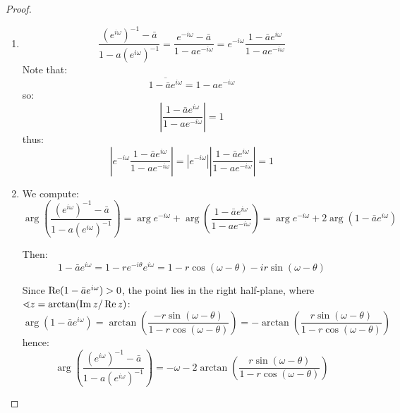 \begin{proof} \hfill
    \begin{enumerate}
        \item
              \[\frac{{(e^{i\omega})}^{-1} - \bar{a}}{1 - a{(e^{i\omega})}^{-1}}
                  = \frac{e^{-i\omega} - \bar{a}}{1 - a e^{-i\omega}}
                  = e^{-i\omega}\frac{1 - \bar{a} e^{i\omega}}{1 - a e^{-i\omega}}\]
              Note that:
              \[\overline{1 - \bar{a} e^{i\omega}} = 1 - a e^{-i\omega}\]
              so:
              \[\left|\frac{1 - \bar{a} e^{i\omega}}{1 - a e^{-i\omega}}\right| = 1\]
              thus:
              \[\left|e^{-i\omega}\frac{1 - \bar{a} e^{i\omega}}{1 - a e^{-i\omega}}\right|
                  =|e^{-i\omega}| \left|\frac{1 - \bar{a} e^{i\omega}}{1 - a e^{-i\omega}}\right|
                  = 1\]
        \item We compute:
              \[\arg \left(\frac{{(e^{i\omega})}^{-1} - \bar{a}}{1 - a{(e^{i\omega})}^{-1}} \right)
                  = \arg e^{-i\omega} + \arg \left(\frac{1 - \bar{a} e^{i\omega}}{1 - a e^{-i\omega}} \right)
                  = \arg e^{-i\omega} + 2 \arg{(1 - \bar{a} e^{i\omega})}\]

              Then:
              \[1 - \bar{a} e^{i\omega}
                  = 1 - r e^{-i \theta} e^{i\omega}
                  = 1 - r \cos (\omega - \theta) - i r \sin(\omega - \theta)\]

              Since $\operatorname{Re}(1-\bar a e^{i\omega}) > 0$, the point lies in the right half-plane, where $\sphericalangle z = \arctan(\operatorname{Im} z / \operatorname{Re} z)$:
              \[\arg{(1 - \bar{a} e^{i\omega})}
                  = \arctan \left(\frac{-r \sin(\omega - \theta)}{1 - r \cos (\omega - \theta)}\right)
                  = -\arctan \left(\frac{r \sin(\omega - \theta)}{1 - r \cos (\omega - \theta)}\right)\]
              hence:
              \[\arg \left(\frac{{(e^{i\omega})}^{-1} - \bar{a}}{1 - a{(e^{i\omega})}^{-1}} \right)
                  = -\omega - 2\arctan \left(\frac{r \sin(\omega - \theta)}{1 - r \cos (\omega - \theta)}\right)\]


\end{enumerate}
\end{proof}
